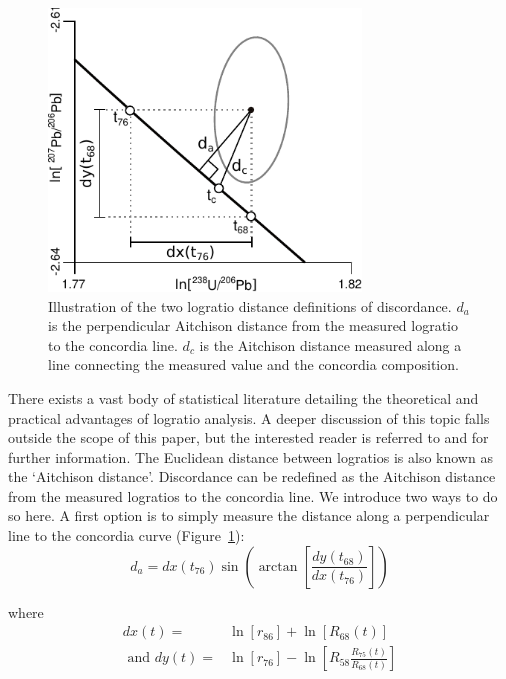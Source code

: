 \documentclass{article}
\begin{document}
\begin{figure}
  \includegraphics[width=8.3cm]{Aitchison.pdf}
  \caption{Illustration of the two logratio distance definitions of
    discordance. $d_a$ is the perpendicular Aitchison distance from
    the measured logratio to the concordia line. $d_c$ is the
    Aitchison distance measured along a line connecting the measured
    value and the concordia composition.
  }
  \label{fig:aitchison}
\end{figure}

There exists a vast body of statistical literature detailing the
theoretical and practical advantages of logratio analysis. A deeper
discussion of this topic falls outside the scope of this paper, but
the interested reader is referred to \citet{aitchison1986} and
\citet{pawlowsky2015} for further information. The Euclidean distance
between logratios is also known as the `Aitchison distance'.
Discordance can be redefined as the Aitchison distance from the
measured logratios to the concordia line. We introduce two ways to do
so here.  A first option is to simply measure the distance along a
perpendicular line to the concordia curve
(Figure~\ref{fig:aitchison}):
\begin{equation}
  d_{a} = dx(t_{76})
  \sin\!\left(\arctan\!\left[ \frac{dy(t_{68})}{dx(t_{76})} \right]
  \right)
  \label{eq:dperp}
\end{equation}

\noindent where
\begin{equation}
\begin{split}
  dx(t)  = & \ln\!\left[r_{86}\right] + \ln\!\left[R_{68}(t)\right] \\
  \mbox{~and~}
  dy(t) = & \ln\!\left[r_{76}\right] -
  \ln\!\left[R_{58}\frac{R_{75}(t)}{R_{68}(t)}\right]
  \end{split}
\end{equation}
\end{document}
